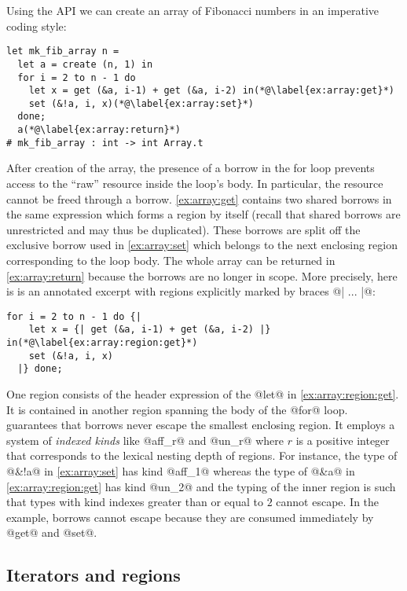 Using the API 
we can create an
array of Fibonacci numbers in an imperative coding style:
\begin{lstlisting}
let mk_fib_array n =
  let a = create (n, 1) in
  for i = 2 to n - 1 do
    let x = get (&a, i-1) + get (&a, i-2) in(*@\label{ex:array:get}*)
    set (&!a, i, x)(*@\label{ex:array:set}*)
  done;
  a(*@\label{ex:array:return}*)
# mk_fib_array : int -> int Array.t
\end{lstlisting}

After
creation of the array, the presence of a borrow in the for loop
prevents access to the ``raw'' resource inside the loop's
body. In particular, the resource cannot be freed through a
borrow. \cref{ex:array:get} contains two shared borrows 
in the same expression which forms a region by itself (recall that
shared borrows are unrestricted and may thus be duplicated). These borrows
are split off the exclusive borrow used in \cref{ex:array:set} which
belongs to the next enclosing region corresponding to the loop body.
The whole array can be returned in \cref{ex:array:return} because  the
borrows are no longer in scope.
%
More precisely, here is is an annotated excerpt with regions explicitly
marked by braces @{| ... |}@:
\begin{lstlisting}[firstnumber=3]
  for i = 2 to n - 1 do {|
    let x = {| get (&a, i-1) + get (&a, i-2) |} in(*@\label{ex:array:region:get}*)
    set (&!a, i, x)
  |} done;
\end{lstlisting}

One region consists of the header expression of the @let@ in
\cref{ex:array:region:get}. It is contained in another region
spanning the body of the @for@ loop. \lang guarantees that borrows
never escape the smallest enclosing region. It employs a system of
\emph{indexed kinds} like @aff_r@ and @un_r@ where
$r$ is a positive integer that corresponds to the lexical nesting
depth of regions. For instance, the type of @&!a@ in
\cref{ex:array:set} has kind @aff_1@ whereas the type of
@&a@ in \cref{ex:array:region:get} has kind
@un_2@ and the typing of the inner region is such that types with
kind indexes greater than or equal to $2$ cannot escape.
In the example, borrows cannot escape  because they are consumed
immediately by @get@ and @set@.



\subsection{Iterators and regions}
\label{tuto:vector}

